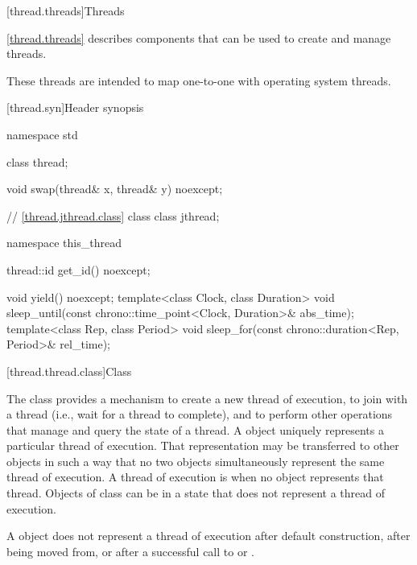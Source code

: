[thread.threads]{Threads}

\pnum
\ref{thread.threads} describes components that can be used to create and manage threads.
\begin{note} These threads are intended to map one-to-one with operating system threads.
\end{note}

[thread.syn]{Header  synopsis}
%

\begin{codeblock}
namespace std {
  class thread;

  void swap(thread& x, thread& y) noexcept;

  // \ref{thread.jthread.class} class 
  class jthread;

  namespace this_thread {
    thread::id get_id() noexcept;

    void yield() noexcept;
    template<class Clock, class Duration>
      void sleep_until(const chrono::time_point<Clock, Duration>& abs_time);
    template<class Rep, class Period>
      void sleep_for(const chrono::duration<Rep, Period>& rel_time);
  }
}
\end{codeblock}

[thread.thread.class]{Class }

\pnum
The class  provides a mechanism to create a new thread of execution, to join with
a thread (i.e., wait for a thread to complete), and to perform other operations that manage and
query the state of a thread. A  object uniquely represents a particular thread of
execution. That representation may be transferred to other  objects in such a way
that no two  objects simultaneously represent the same thread of execution. A
thread of execution is  when no  object represents that thread.
Objects of class  can be in a state that does not represent a thread of
execution. \begin{note} A  object does not represent a thread of execution after
default construction, after being moved from, or after a successful call to  or
. \end{note}

